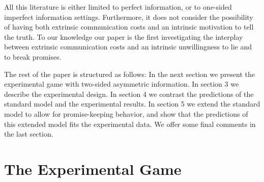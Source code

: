 \documentclass[12pt]{article}
\theoremstyle{break}
\begin{document}
All this literature is either limited to perfect information, or to one-sided imperfect information settings. Furthermore, it does not consider the possibility of having both extrinsic communication costs and an intrinsic motivation to tell the truth. To our knowledge our paper is the first investigating the interplay between extrinsic communication costs and an intrinsic unwillingness to lie and to break promises.


The rest of the paper is structured as follows: In the next section we present the experimental game with two-sided asymmetric information. In section 3 we describe the experimental design. In section 4 we contrast the predictions of the standard model and the experimental results. In section 5 we extend the standard model to allow for promise-keeping behavior, and show that the predictions of this extended model fits the experimental data. We offer some final comments in the last section.

\section{The Experimental Game}
\end{document}
